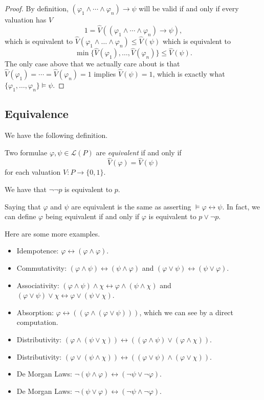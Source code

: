 \begin{proof}
	By definition, $(\varphi_1\land\cdots\land\varphi_n)\to\psi$ will be valid if and only if every valuation has $V$
	\[1=\hat V((\varphi_1\land\cdots\land\varphi_n)\to\psi),\]
	which is equivalent to $\hat V(\varphi_1\land\dots\land\varphi_n)\le\hat V(\psi)$ which is equivalent to
	\[\min\{\hat V(\varphi_1),\ldots,\hat V(\varphi_n)\}\le\hat V(\psi).\]
	The only case above that we actually care about is that $\hat V(\varphi_1)=\cdots=\hat V(\varphi_n)=1$ implies $\hat V(\psi)=1$, which is exactly what $\{\varphi_1,\ldots,\varphi_n\}\models\psi$.
\end{proof}

\subsection{Equivalence}
We have the following definition.
\begin{definition}[Equivalence]
	Two formulae $\varphi,\psi\in\mathcal L(P)$ are \textit{equivalent} if and only if
	\[\hat V(\varphi)=\hat V(\psi)\]
	for each valuation $V:P\to\{0,1\}$.
\end{definition}
\begin{example}
	We have that $\lnot\lnot p$ is equivalent to $p$.
\end{example}
\begin{remark}
	Saying that $\varphi$ and $\psi$ are equivalent is the same as asserting $\models\varphi\leftrightarrow\psi$. In fact, we can define $\varphi$ being equivalent if and only if $\varphi$ is equivalent to $p\lor\lnot p$.
\end{remark}
Here are some more examples.
\begin{itemize}
	\item Idempotence: $\varphi\leftrightarrow(\varphi\land\varphi)$.
	\item Commutativity: $(\varphi\land\psi)\leftrightarrow(\psi\land\varphi)$ and $(\varphi\lor\psi)\leftrightarrow(\psi\lor\varphi)$.
	\item Associativity: $(\varphi\land\psi)\land\chi\leftrightarrow\varphi\land(\psi\land\chi)$ and $(\varphi\lor\psi)\lor\chi\leftrightarrow\varphi\lor(\psi\lor\chi)$.
	\item Absorption: $\varphi\leftrightarrow((\varphi\land(\varphi\lor\psi)))$, which we can see by a direct computation.
	\item Distributivity: $(\varphi\land(\psi\lor\chi))\leftrightarrow((\varphi\land\psi)\lor(\varphi\land\chi))$.
	\item Distributivity: $(\varphi\lor(\psi\land\chi))\leftrightarrow((\varphi\lor\psi)\land(\varphi\lor\chi))$.
	\item De Morgan Laws: $\lnot(\psi\land\varphi)\leftrightarrow(\lnot\psi\lor\lnot\varphi)$.
	\item De Morgan Laws: $\lnot(\psi\lor\varphi)\leftrightarrow(\lnot\psi\land\lnot\varphi)$.
\end{itemize}